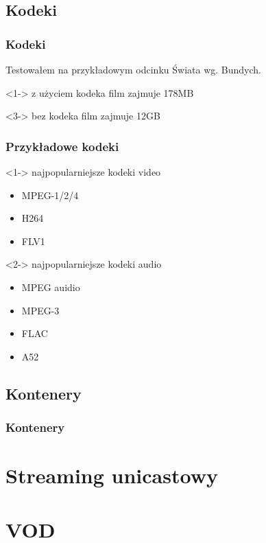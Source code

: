 \documentclass[10pt]{beamer}
\begin{document}
\subsection{Kodeki}
\begin{frame}
	\frametitle{Kodeki}
	Testowałem na przykładowym odcinku Świata wg. Bundych.
	\begin{block}<1->
	{z użyciem kodeka}
	\uncover<2->
	{
		film zajmuje 178MB
	}
	\end{block}
	\begin{block}<3->
	{bez kodeka}
	\uncover<4->
	{
		film zajmuje 12GB
	}
	\end{block}
\end{frame}
\begin{frame}
	\frametitle{Przykładowe kodeki}
	\begin{block}<1->
	{najpopularniejsze kodeki video}
	\begin{itemize}
	\item MPEG-1/2/4
	\item H264
	\item FLV1
	\end{itemize}
	\end{block}
	\begin{block}<2->
	{najpopularniejsze kodeki audio}
	\begin{itemize}
	\item MPEG auidio
	\item MPEG-3
	\item FLAC
	\item A52
	\end{itemize}
	\end{block}
\end{frame}
\subsection{Kontenery}
\begin{frame}
	\frametitle{Kontenery}
\end{frame}
\section{Streaming unicastowy}
\section{VOD}
\end{document}
